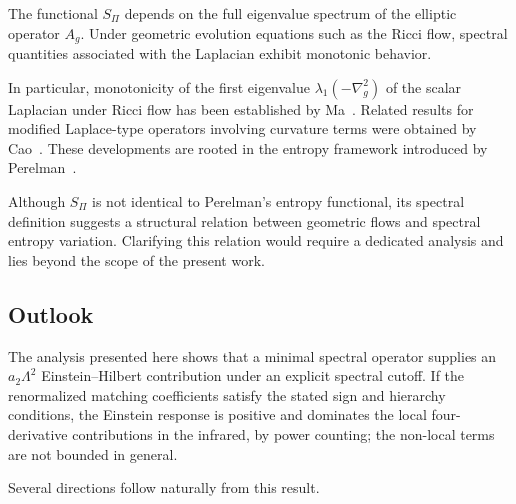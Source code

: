 \documentclass[pdflatex,sn-mathphys-num]{sn-jnl} %
\theoremstyle{remark}
\theoremstyle{plain}
\begin{document}
    The functional $S_\Pi$ depends on the full eigenvalue spectrum of the
    elliptic operator $A_g$.
    Under geometric evolution equations such as the Ricci flow,
    spectral quantities associated with the Laplacian exhibit
    monotonic behavior.

    In particular, monotonicity of the first eigenvalue
    $\lambda_1(-\nabla_g^2)$ of the scalar Laplacian under Ricci flow
    has been established by Ma~\cite{Ma2006}.
    Related results for modified Laplace-type operators involving
    curvature terms were obtained by Cao~\cite{Cao2007}.
    These developments are rooted in the entropy framework introduced
    by Perelman~\cite{Perelman2002}.

    Although $S_\Pi$ is not identical to Perelman's entropy functional,
    its spectral definition suggests a structural relation between
    geometric flows and spectral entropy variation.
    Clarifying this relation would require a dedicated analysis
    and lies beyond the scope of the present work.

  \subsection{Outlook}
    \label{subsec:outlook}

    The analysis presented here shows that a minimal spectral operator supplies an $a_2\Lambda^2$ Einstein--Hilbert
    contribution under an explicit spectral cutoff.
    If the renormalized matching coefficients satisfy the stated sign and hierarchy conditions, the Einstein response is
    positive and dominates the local four-derivative contributions in the infrared, by power counting; the non-local
    terms are not bounded in general.

    Several directions follow naturally from this result.
\end{document}

